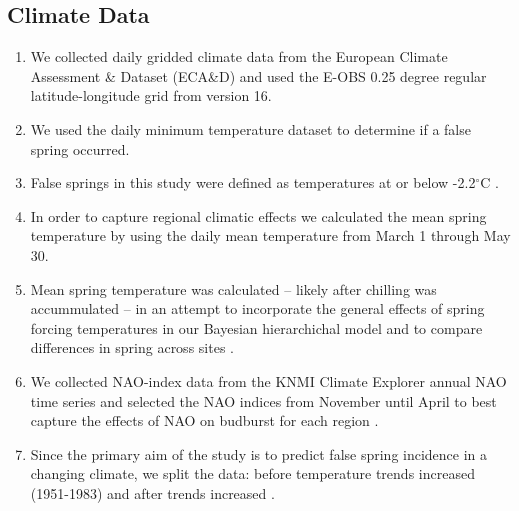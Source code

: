 \documentclass{article}\usepackage[]{graphicx}\usepackage[]{color}
\begin{document}
\subsection*{Climate Data}
\begin{enumerate}
\item We collected daily gridded climate data from the European Climate Assessment \& Dataset (ECA\&D) and used the E-OBS 0.25 degree regular latitude-longitude grid from version 16. 
\item We used the daily minimum temperature dataset to determine if a false spring occurred.
\item False springs in this study were defined as temperatures at or below -2.2$^{\circ}$C \citep{Schwartz1993}.
\item In order to capture regional climatic effects we calculated the mean spring temperature by using the daily mean temperature from March 1 through May 30.
\item Mean spring temperature was calculated -- likely after chilling was accummulated -- in an attempt to incorporate the general effects of spring forcing temperatures in our Bayesian hierarchichal model and to compare differences in spring across sites \citep{Basler2012, Korner2016}.
\item We collected NAO-index data from the KNMI Climate Explorer annual NAO time series and selected the NAO indices from November until April to best capture the effects of NAO on budburst for each region \citep{NAO}.
\item Since the primary aim of the study is to predict false spring incidence in a changing climate, we split the data: before temperature trends increased (1951-1983) and after trends increased \citep[1984-2016,][]{Stocker2013, Kharouba2018}.
\end{enumerate}
\end{document}
